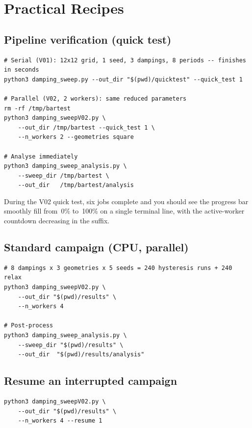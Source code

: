 \documentclass[11pt,a4paper]{article}
\begin{document}
\section{Practical Recipes}
\label{sec:recipes}

\subsection{Pipeline verification (quick test)}

\begin{lstlisting}
# Serial (V01): 12x12 grid, 1 seed, 3 dampings, 8 periods -- finishes in seconds
python3 damping_sweep.py --out_dir "$(pwd)/quicktest" --quick_test 1

# Parallel (V02, 2 workers): same reduced parameters
rm -rf /tmp/bartest
python3 damping_sweepV02.py \
    --out_dir /tmp/bartest --quick_test 1 \
    --n_workers 2 --geometries square

# Analyse immediately
python3 damping_sweep_analysis.py \
    --sweep_dir /tmp/bartest \
    --out_dir   /tmp/bartest/analysis
\end{lstlisting}

\noindent During the V02 quick test, six jobs complete and you should see the
progress bar smoothly fill from~0\% to~100\% on a single terminal line, with
the active-worker countdown decreasing in the suffix.

\subsection{Standard campaign (CPU, parallel)}

\begin{lstlisting}
# 8 dampings x 3 geometries x 5 seeds = 240 hysteresis runs + 240 relax
python3 damping_sweepV02.py \
    --out_dir "$(pwd)/results" \
    --n_workers 4

# Post-process
python3 damping_sweep_analysis.py \
    --sweep_dir "$(pwd)/results" \
    --out_dir  "$(pwd)/results/analysis"
\end{lstlisting}

\subsection{Resume an interrupted campaign}

\begin{lstlisting}
python3 damping_sweepV02.py \
    --out_dir "$(pwd)/results" \
    --n_workers 4 --resume 1
\end{lstlisting}
\end{document}
